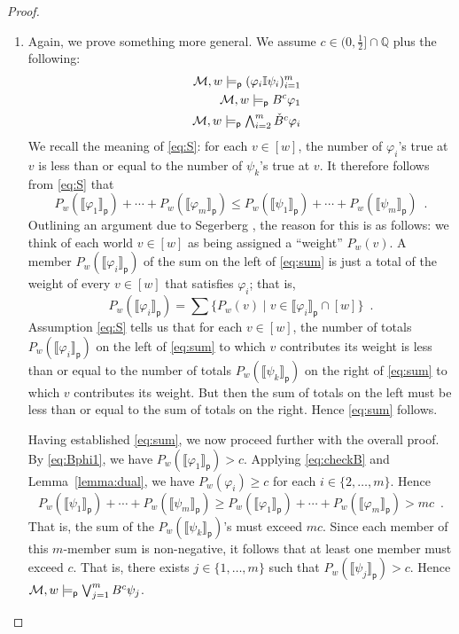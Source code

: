 \documentclass[12pt]{article}
\theoremstyle{definition}
\newcommand{\Rat}{\mathbb{Q}}  %
\newcommand{\M}{{\cal M}}      %
\newcommand{\modelsp}{\models_{\mathsf{p}}}                  %
\newcommand{\semp}[1]{\llbracket{#1}\rrbracket_{\mathsf{p}}} %
\begin{document}
\begin{proof}
\begin{enumerate}
  \item Again, we prove something more general.  We assume
    $c\in(0,\frac 12]\cap\Rat$ plus the following:
    \begin{eqnarray}
      &&
      \M,w\modelsp (\varphi_i\mathbb{I}\psi_i)_{i=1}^m
      \label{eq:S}
      \\
      &&
      \M,w\modelsp B^c\varphi_1
      \label{eq:Bphi1}
      \\
      &&
      \textstyle \M,w\modelsp \bigwedge_{i=2}^m\check B^c\varphi_i
      \label{eq:checkB}
    \end{eqnarray}
    We recall the meaning of \eqref{eq:S}: for each $v\in[w]$, the
    number of $\varphi_i$'s true at $v$ is less than or equal to the
    number of $\psi_k$'s true at $v$.  It therefore follows from
    \eqref{eq:S} that
    \begin{equation}
      P_w(\semp{\varphi_1})+\cdots+P_w(\semp{\varphi_m})\leq
      P_w(\semp{\psi_1})+\cdots+P_w(\semp{\psi_m})\enspace.
      \label{eq:sum}
    \end{equation}
    Outlining an argument due to Segerberg
    \cite[pp.~344--346]{Segerberg1971:qpiams}, the reason for this is
    as follows: we think of each world $v\in[w]$ as being assigned a
    ``weight'' $P_w(v)$.  A member $P_w(\semp{\varphi_i})$ of the sum on
    the left of \eqref{eq:sum} is just a total of the weight of every
    $v\in[w]$ that satisfies $\varphi_i$; that is,
    \[
    P_w(\semp{\varphi_i})=\sum\{P_w(v)\mid
    v\in\semp{\varphi_i}\cap[w]\}\enspace.
    \]
    Assumption \eqref{eq:S} tells us that for each $v\in[w]$, the
    number of totals $P_w(\semp{\varphi_i})$ on the left of
    \eqref{eq:sum} to which $v$ contributes its weight is less than or
    equal to the number of totals $P_w(\semp{\psi_k})$ on the right of
    \eqref{eq:sum} to which $v$ contributes its weight.  But then the
    sum of totals on the left must be less than or equal to the sum of
    totals on the right.  Hence \eqref{eq:sum} follows.

    Having established \eqref{eq:sum}, we now proceed further with the
    overall proof.  By \eqref{eq:Bphi1}, we have
    $P_w(\semp{\varphi_1})>c$.  Applying \eqref{eq:checkB} and
    Lemma~\ref{lemma:dual}, we have $P_w(\varphi_i)\geq c$ for each
    $i\in\{2,\dots,m\}$.  Hence
    \[
    P_w(\semp{\psi_1})+\cdots+P_w(\semp{\psi_m})\geq
    P_w(\semp{\varphi_1})+\cdots+P_w(\semp{\varphi_m})> mc\enspace.
    \]
    That is, the sum of the $P_w(\semp{\psi_k})$'s must exceed $mc$.
    Since each member of this $m$-member sum is non-negative, it
    follows that at least one member must exceed $c$.  That is, there
    exists $j\in\{1,\dots,m\}$ such that $P_w(\semp{\psi_j})>c$.
    Hence $\M,w\modelsp\bigvee_{j=1}^mB^c\psi_j$. \qedhere
  \end{enumerate}
\end{proof}
\end{document}
